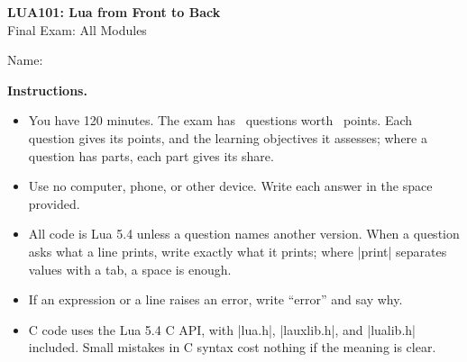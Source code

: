 \documentclass[11pt,addpoints]{exam}
\begin{document}
\begin{center}
  {\Large\bfseries LUA101: Lua from Front to Back}\\[0.5ex]
  {\large Final Exam: All Modules}
\end{center}

\vspace{1em}
\noindent Name: \makebox[0.6\textwidth]{\hrulefill}

\vspace{1em}
\noindent\textbf{Instructions.}
\begin{itemize}
  \item You have 120 minutes. The exam has \numquestions\ questions worth \numpoints\ points. Each
    question gives its points, and the learning objectives it assesses; where a question has
    parts, each part gives its share.
  \item Use no computer, phone, or other device. Write each answer in the space provided.
  \item All code is Lua 5.4 unless a question names another version. When a question asks what a
    line prints, write exactly what it prints; where \code|print| separates values with a tab, a
    space is enough.
  \item If an expression or a line raises an error, write ``error'' and say why.
  \item C code uses the Lua 5.4 C API, with \code|lua.h|, \code|lauxlib.h|, and \code|lualib.h|
    included. Small mistakes in C syntax cost nothing if the meaning is clear.
\end{itemize}

\begin{center}
  \gradetable[v][pages]
\end{center}
\end{document}

